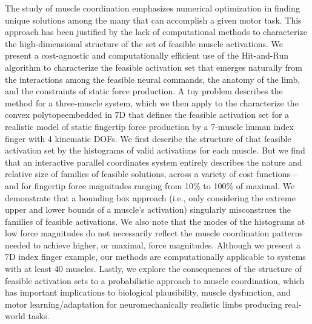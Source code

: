 The study of muscle coordination emphasizes numerical optimization in finding unique solutions among the many that can accomplish a given motor task.
This approach has been justified by the lack of computational methods to characterize the high-dimensional structure of the set of feasible muscle activations.
We present a cost-agnostic and computationally efficient use of the Hit-and-Run algorithm to characterize the feasible activation set that emerges naturally from the interactions among the feasible neural commands, the anatomy of the limb, and the constraints of static force production.
A toy problem describes the method for a three-muscle system, which we then apply to the characterize the convex polytopeembedded in 7D that defines the feasible activation set for a realistic model of static fingertip force production by a 7-muscle human index finger with 4 kinematic DOFs.
We first describe the structure of that feasible activation set by the histograms of valid activations for each muscle.
But we find that an interactive parallel coordinates system entirely describes the nature and relative size of families of feasible solutions, across a variety of cost functions---and for fingertip force magnitudes ranging from 10\% to 100\% of maximal.
We demonstrate that a bounding box approach (i.e., only considering the extreme upper and lower bounds of a muscle's activation) singularly misconstrues the families of feasible activations.
We also note that the modes of the histograms at low force magnitudes do not necessarily reflect the muscle coordination patterns needed to achieve higher, or maximal, force magnitudes.
Although we present a 7D index finger example, our methods are computationally applicable to systems with at least 40 muscles.
Lastly, we explore the consequences of the structure of feasible activation sets to a probabilistic approach to muscle coordination, which has important implications to biological plausibility, muscle dysfunction, and motor learning/adaptation for neuromechanically realistic limbs producing real-world tasks.
